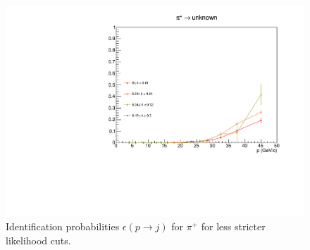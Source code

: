 \begin{figure}[!p]
  \includegraphics[scale=0.38]{./gfx/pip_u_less.pdf}
	\caption{Identification probabilities $\epsilon(p \rightarrow j)$ for $\pi^+$ for less stricter likelihood cuts.}
	\label{pic:Effpipless}
\end{figure}

